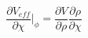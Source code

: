 \begin{equation}
\frac{\partial V_{eff}} {\partial \chi}|_{\phi} = \frac{\partial V} {\partial
\rho} \frac{\partial \rho} {\partial \chi}
\end{equation}

